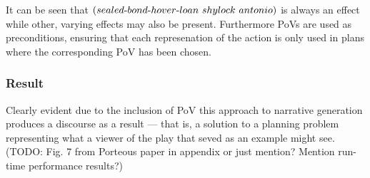 It can be seen that $(sealed\text{-} bond\text{-} hover\text{-} loan\ shylock\ antonio)$ is always an effect while other, varying effects may also be present. Furthermore PoVs are used as preconditions, ensuring that each represenation of the action is only used in plans where the corresponding PoV has been chosen.%

\subsubsection{Result}
Clearly evident due to the inclusion of PoV this approach to narrative generation produces a discourse as a result --- that is, a solution to a planning problem representing what a viewer of the play that seved as an example might see. (TODO: Fig. 7 from Porteous paper in appendix or just mention? Mention run-time performance results?)
